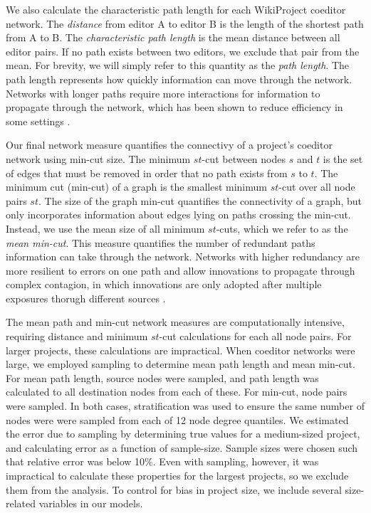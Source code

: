 \documentclass[10pt,twocolumn]{article}
\newcommand{\+}{\phantom{-}}
\begin{document}
We also calculate the characteristic path length for each WikiProject coeditor network.
The {\em distance} from editor A to editor B is the length of the shortest path from A to B.
The {\em characteristic path length} is the mean distance between all editor pairs.
If no path exists between two editors, we exclude that pair from the mean.
For brevity, we will simply refer to this quantity as the {\em path length}.
The path length represents how quickly information can move through the network.
Networks with longer paths require more interactions for information to propagate through
the network,
which has been shown to reduce efficiency in some settings
\cite{mason_propagation_2008,barkoczi_social_2016}.

Our final network measure quantifies the connectivy of a project's coeditor network using
min-cut size.
The minimum $st$-cut between nodes $s$ and $t$ is the set of edges that must be removed in order that
no path exists from $s$ to $t$.
The minimum cut (min-cut) of a graph is the smallest minimum $st$-cut over all node pairs $st$. 
The size of the graph min-cut quantifies the connectivity of a graph,
but only incorporates information about edges lying on paths crossing the min-cut.
Instead, we use the mean size of all minimum $st$-cuts, which we refer to as the
{\em mean min-cut}.
This measure quantifies the number of redundant paths information can take through the network.
Networks with higher redundancy are more resilient to errors on one path \cite{albert_error_2000}
and allow innovations to propagate through complex contagion,
in which innovations are only adopted after multiple exposures thorugh different sources
\cite{centola_complex_2007}.

The mean path and min-cut network measures are computationally intensive,
requiring distance and minimum $st$-cut calculations for each all node pairs.
For larger projects, these calculations are impractical.
When coeditor networks were large, we employed sampling to determine mean path length and mean
min-cut.
For mean path length, source nodes were sampled, and path length was calculated to all destination nodes
from each of these.
For min-cut, node pairs were sampled.
In both cases, stratification was used to ensure the same number of nodes were were sampled from each of
12 node degree quantiles.
We estimated the error due to sampling by determining true values for a medium-sized project,
and calculating error as a function of sample-size.
Sample sizes were chosen such that relative error was below 10\%.
Even with sampling, however, it was impractical to calculate these properties for the largest projects,
so we exclude them from the analysis.
To control for bias in project size, we include several size-related variables in our models.
\end{document}
